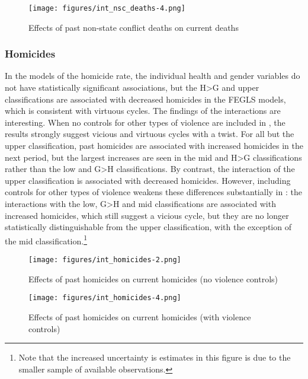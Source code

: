 \documentclass[12pt]{article}
\begin{document}
\begin{figure}[!htb]
    \centering
    \caption{Effects of past non-state conflict deaths on current deaths}
    \label{int_deaths_nsc}
    \texttt{[image: figures/int\_nsc\_deaths-4.png]}
\end{figure}

\subsubsection{Homicides}

In the models of the homicide rate, the individual health and gender variables do not have statistically significant associations, but the H>G and upper classifications are associated with decreased homicides in the FEGLS models, which is consistent with virtuous cycles.
The findings of the interactions are interesting.
When no controls for other types of violence are included in , the results strongly suggest vicious and virtuous cycles with a twist.
For all but the upper classification, past homicides are associated with increased homicides in the next period, but the largest increases are seen in the mid and H>G classifications rather than the low and G>H classifications.
By contrast, the interaction of the upper classification is associated with decreased homicides.
However, including controls for other types of violence weakens these differences substantially in : the interactions with the low, G>H and mid classifications are associated with increased homicides, which still suggest a vicious cycle, but they are no longer statistically distinguishable from the upper classification, with the exception of the mid classification.\footnote{
Note that the increased uncertainty is estimates in this figure is due to the smaller sample of available observations.}

\begin{figure}[!htb]
    \centering
    \caption{Effects of past homicides on current homicides (no violence controls)}
    \label{int_homicides}
    \texttt{[image: figures/int\_homicides-2.png]}
\end{figure}
\begin{figure}[htb]
    \centering
    \caption{Effects of past homicides on current homicides (with violence controls)}
    \label{int_homicides_controls}
    \texttt{[image: figures/int\_homicides-4.png]}
\end{figure}
\end{document}
